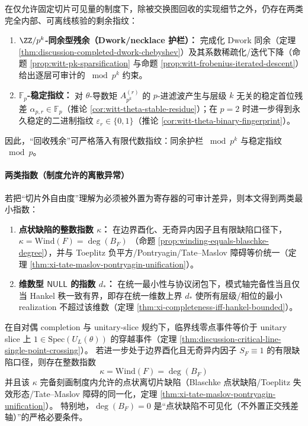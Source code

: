 \begin{corollary}\label{cor:discussion-recycling-residuals}
在仅允许固定切片可见量的制度下，除被交换图回收的实现细节之外，仍存在两类完全内部、可离线核验的剩余指纹：
\begin{enumerate}
  \item \textbf{\(\ZZ/p^k\)-同余型残余（Dwork/necklace 护栏）：}
  完成化 Dwork 同余（定理 \ref{thm:discussion-completed-dwork-chebyshev}）及其系数稀疏化/迭代下降（命题 \ref{prop:witt-pk-sparsification} 与命题 \ref{prop:witt-frobenius-iterated-descent}）给出逐层可审计的 \(\bmod p^k\) 约束。
  \item \textbf{\(\mathbb{F}_p\)-稳定指纹：}
  对 \(\theta\)-导数矩 \(A^{(r)}_{p^k}\) 的 \(p\)-进滤波产生与层级 \(k\) 无关的稳定首位残差 \(\alpha_{p,r}\in\mathbb{F}_p\)（推论 \ref{cor:witt-theta-stable-residue}）；在 \(p=2\) 时进一步得到永久稳定的二进制指纹 \(\varepsilon_r\in\{0,1\}\)（推论 \ref{cor:witt-theta-binary-fingerprint}）。
\end{enumerate}
因此，“回收残余”可严格落入有限代数指纹：同余护栏 \(\bmod p^k\) 与稳定指纹 \(\bmod p\)。
\end{corollary}

\paragraph{两类指数（制度允许的离散异常）}
若把“切片外自由度”理解为必须被外置为寄存器的可审计差异，则本文得到两类最小指数：
\begin{enumerate}
  \item \textbf{点状缺陷的整数指数 \(\kappa\)：}
  在边界酉化、无奇异内因子且有限缺陷口径下，
  \(\kappa=\mathrm{Wind}(F)=\deg(B_F)\)
  （命题 \ref{prop:winding-equals-blaschke-degree}），并与 Toeplitz 负平方/Pontryagin/Tate--Maslov 障碍等价统一（定理 \ref{thm:xi-tate-maslov-pontryagin-unification}）。
  \item \textbf{维数型 \(\mathsf{NULL}\) 的指数 \(d_\ast\)：}
  在统一最小性与协议闭包下，模式轴完备性当且仅当 Hankel 秩一致有界，即存在统一维数上界 \(d_\ast\) 使所有层级/相位的最小 realization 不超过该维数（定理 \ref{thm:xi-completeness-iff-hankel-bounded}）。
\end{enumerate}

\begin{theorem}\label{thm:discussion-crossing-winding-blaschke-index}
在自对偶 completion 与 unitary-slice 规约下，临界线零点事件等价于 unitary slice 上 \(1\in\mathrm{Spec}(U_L(\theta))\) 的穿越事件（定理 \ref{thm:discussion-critical-line-single-point-crossing}）。
若进一步处于边界酉化且无奇异内因子 \(S_F\equiv 1\) 的有限缺陷口径，则存在整数指数
\[
\boxed{\ \kappa=\mathrm{Wind}(F)=\deg(B_F)\ }
\]
并且该 \(\kappa\) 完备刻画制度内允许的点状离切片缺陷（Blaschke 点状缺陷/Toeplitz 失效形态/Tate--Maslov 障碍的同一化，定理 \ref{thm:xi-tate-maslov-pontryagin-unification}）。
特别地，\(\deg(B_F)=0\) 是“点状缺陷不可见化（不外置正交残差轴）”的严格必要条件。
\end{theorem}

